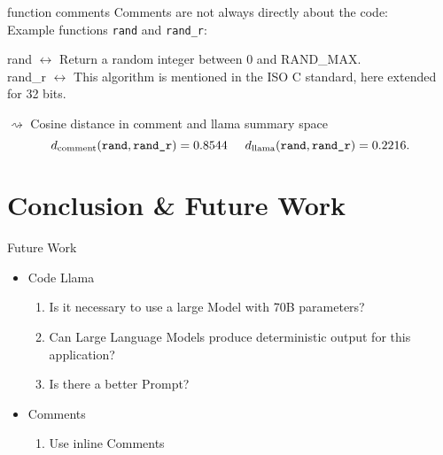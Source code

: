 \documentclass[aspectratio=1610,12pt]{beamer}
\begin{document}
\begin{frame}{function comments}
  Comments are not always directly about the code:\\
  Example functions \texttt{rand} and \texttt{rand\_r}:
  \begin{center}
    rand $\leftrightarrow$ Return a random integer between 0
      and RAND\_MAX.\\
    rand\_r  $\leftrightarrow$ This algorithm is mentioned in 
    the ISO C standard, here extended for 32 bits.
  \end{center}
  $\rightsquigarrow$ Cosine distance in comment and 
  llama summary space
    \[
      d_\text{comment}(\texttt{rand}, \texttt{rand\_r}) = 0.8544
      \hspace{0.5cm}
      d_\text{llama}(\texttt{rand}, \texttt{rand\_r}) = 0.2216.
    \]
\end{frame}


\section{Conclusion \& Future Work}
\begin{frame}{Future Work}
  \begin{itemize}
    \item Code Llama
      \begin{enumerate}
        \item Is it necessary to use a 
          large Model with 70B parameters?
        \item Can Large Language Models 
        produce deterministic output for this application?
        \item Is there a better Prompt?
      \end{enumerate}
    \item Comments
      \begin{enumerate}
        \item Use inline Comments
      \end{enumerate}
  \end{itemize}
\end{frame}
\end{document}
